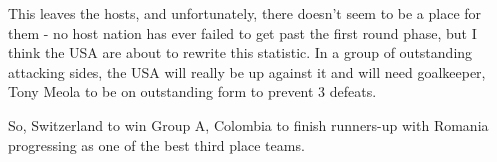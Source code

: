 This leaves the hosts, and unfortunately, there doesn't seem to be a place for
them - no host nation has ever failed to get past the first round phase, but I
think the USA are about to rewrite this statistic. In a group of outstanding
attacking sides, the USA will really be up against it and will need goalkeeper,
Tony Meola to be on outstanding form to prevent 3 defeats.

So, Switzerland to win Group A, Colombia to finish runners-up with Romania 
progressing as one of the best third place teams.

